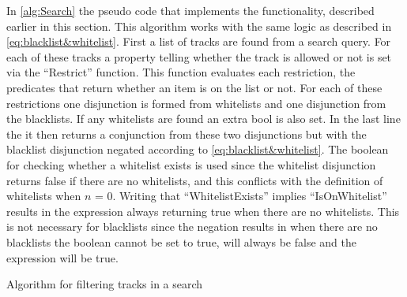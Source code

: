 In \cref{alg:Search} the pseudo code that implements the functionality, described earlier in this section. This algorithm works with the same logic as described in \cref{eq:blacklist&whitelist}. First a list of tracks are found from a search query. For each of these tracks a property telling whether the track is allowed or not is set via the \enquote{Restrict} function. This function evaluates each restriction, the predicates that return whether an item is on the list or not. For each of these restrictions one disjunction is formed from whitelists and one disjunction from the blacklists. If any whitelists are found an extra bool is also set. In the last line the it then returns a conjunction from these two disjunctions but with the blacklist disjunction negated according to \cref{eq:blacklist&whitelist}. The boolean for checking whether a whitelist exists is used since the whitelist disjunction returns false if there are no whitelists, and this conflicts with the definition of whitelists when $n$ = $0$. Writing that \enquote{WhitelistExists} implies \enquote{IsOnWhitelist} results in the expression always returning true when there are no whitelists. This is not necessary for blacklists since the negation results in when there are no blacklists the boolean cannot be set to true, will always be false and the expression will be true.

\begin{algorithm}[htbp] \caption{Algorithm for filtering tracks in a search}\label{alg:Search}
\begin{algorithmic}[1]
		\EndFor{}
	\EndFunction{}\\
			\EndIf{}
		\EndFor{}
	\EndFunction{}
\end{algorithmic}
\end{algorithm}

